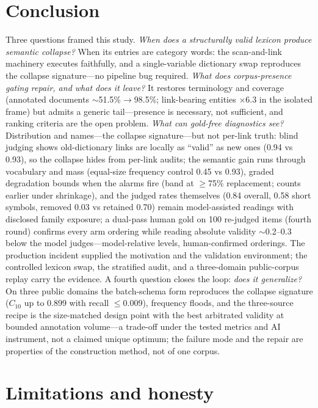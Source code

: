 \documentclass[preprint,12pt]{elsarticle}
\begin{document}
\section{Conclusion}
\label{sec:conclusion}

Three questions framed this study. \emph{When does a structurally valid
lexicon produce semantic collapse?} When its entries are category words:
the scan-and-link machinery executes faithfully, and a single-variable
dictionary swap reproduces the collapse signature---no pipeline bug
required. \emph{What does corpus-presence gating repair, and what does it
leave?} It restores terminology and coverage (annotated documents
${\sim}$51.5\%$\to$98.5\%; link-bearing entities $\times$6.3 in the
isolated frame) but admits a generic tail---presence is necessary, not
sufficient, and ranking criteria are the open problem. \emph{What can
gold-free diagnostics see?} Distribution and names---the collapse
signature---but not per-link truth: blind judging shows old-dictionary
links are locally as ``valid'' as new ones (0.94 vs 0.93), so the
collapse hides from per-link audits; the semantic gain runs through
vocabulary and mass (equal-size frequency control 0.45 vs 0.93), graded
degradation bounds when the alarms fire (band at $\geq$75\%
replacement; counts earlier under shrinkage), and the judged rates
themselves (0.84 overall, 0.58 short symbols, removed 0.03 vs retained
0.70) remain model-assisted readings with disclosed family exposure;
a dual-pass human gold on 100 re-judged items (fourth round) confirms
every arm ordering while reading absolute validity ${\sim}$0.2--0.3
below the model judges---model-relative levels, human-confirmed
orderings. The production
incident supplied the motivation and the validation environment; the
controlled lexicon swap, the stratified audit, and a three-domain
public-corpus replay carry the evidence. A fourth question closes the
loop: \emph{does it generalize?} On three public domains the
batch-schema form reproduces the collapse signature ($C_{10}$ up to
0.899 with recall ${\le}$0.009), frequency floods, and the three-source
recipe is the size-matched design point with the best arbitrated
validity at bounded annotation volume---a trade-off under the tested
metrics and AI instrument, not a claimed unique optimum; the failure mode and the
repair are properties of the construction method, not of one corpus.

\section{Limitations and honesty}
\label{sec:limitations}
\end{document}
